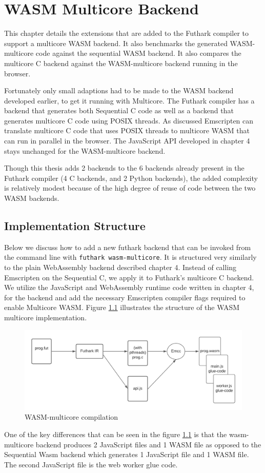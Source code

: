 \documentclass[11pt]{book}
\begin{document}
\newpage
\chapter{WASM Multicore Backend}

This chapter details the extensions that are added to the Futhark compiler to support a multicore WASM backend. It also benchmarks the generated WASM-multicore code against the sequential WASM backend. It also compares the multicore C backend against the WASM-multicore backend running in the browser.

Fortunately only small adaptions had to be made to the WASM backend developed earlier, to get it running with Multicore. The Futhark compiler has a backend that generates both Sequential C code as well as a backend that generates multicore C code using POSIX threads. As discussed Emscripten can translate multicore C code that uses POSIX threads to multicore WASM that can run in parallel in the browser. The JavaScript API developed in chapter 4 stays unchanged for the WASM-multicore backend. 

Though this thesis adds 2 backends to the 6 backends already present in the Futhark compiler (4 C backends, and 2 Python backends), the added complexity is relatively modest because of the high degree of reuse of code between the two WASM backends. 


\section{Implementation Structure}

Below we discuss how to add a new futhark backend that can be invoked from the command line with \texttt{futhark wasm-multicore}. It is structured very similarly to the plain WebAssembly backend described chapter 4. Instead of calling Emscripten on the Sequential C, we apply it to Futhark's multicore C backend. We utilize the JavaScript and WebAssembly runtime code written in chapter 4, for the backend and add the necessary Emscripten compiler flags required to enable Multicore WASM. Figure \ref{fig:wasm-mc} illustrates the structure of the WASM multicore implementation.

\begin{figure}[htbp]
\centerline{\includegraphics[width=\textwidth]{figures/WASM_MC_compiler.png}}
    \caption{WASM-multicore compilation}
\label{fig:wasm-mc}
\end{figure}
One of the key differences that can be seen in the figure \ref{fig:wasm-mc} is that the wasm-multicore backend produces 2 JavaScript files and 1 WASM file as opposed to the Sequential Wasm backend which generates 1 JavaScript file and 1 WASM file. The second JavaScript file is the web worker glue code.
\end{document}
